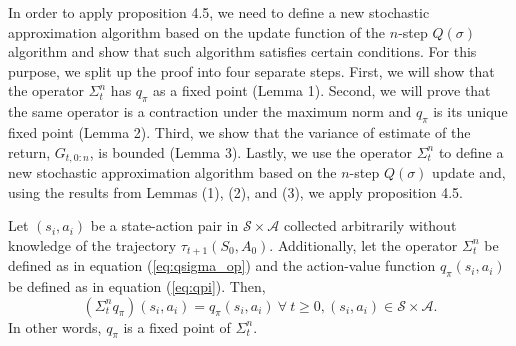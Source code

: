 In order to apply proposition 4.5, we need to define a new stochastic approximation algorithm based on the update function of the $n$-step $Q(\sigma)$ algorithm and show that such algorithm satisfies certain conditions.
For this purpose, we split up the proof into four separate steps. 
First, we will show that the operator $\Sigma^n_t$ has $q_\pi$ as a fixed point (Lemma 1).
Second, we will prove that the same operator is a contraction under the maximum norm and $q_\pi$ is its unique fixed point (Lemma 2).
Third, we show that the variance of estimate of the return, $G_{t, 0:n}$, is bounded (Lemma 3).
Lastly, we use the operator $\Sigma^n_t$ to define a new stochastic approximation algorithm based on the $n$-step $Q(\sigma)$ update and, using the results from Lemmas (1), (2), and (3), we apply proposition 4.5.

\begin{lemma}
\label{lem:fixedpoint}
Let $(s_i, a_i )$ be a state-action pair in $\mathcal{S} \times \mathcal{A}$ collected arbitrarily without knowledge of the trajectory $\tau_{t+1}(S_0, A_0)$.
Additionally, let the operator $\Sigma^n_t$ be defined as in equation (\ref{eq:qsigma_op}) and the action-value function $q_\pi(s_i, a_i)$ be defined as in equation (\ref{eq:qpi}). 
Then, 
\begin{equation}
(\Sigma^n_t q_\pi) (s_i, a_i) = q_\pi(s_i, a_i) \ \forall \ t \geq 0, (s_i,a_i) \in \mathcal{S} \times \mathcal{A}.
\end{equation}
In other words, $q_\pi$ is a fixed point of $\Sigma^n_t$.
\end{lemma}

